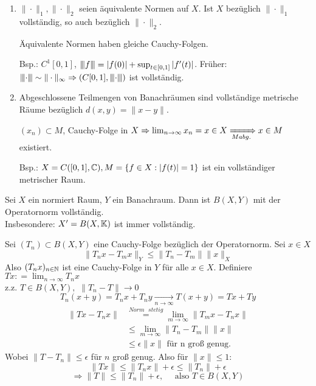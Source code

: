\begin{bemerkung}
	\begin{enumerate}[label=\alph*\upshape)]
		\item $\| \cdot \|_{1}, \| \cdot \|_{2}$ seien äquivalente Normen auf $X$. Ist $X$ bezüglich $\| \cdot \|_{1}$ vollständig, so auch bezüglich $\| \cdot \|_{2}$.
			\begin{beweis}
				Äquivalente Normen haben gleiche Cauchy-Folgen.
			\end{beweis}
			Bsp.: $C^{1}[0, 1]$, ${\left\vert\kern-0.25ex\left\vert\kern-0.25ex\left\vert f\right\vert\kern-0.25ex\right\vert\kern-0.25ex\right\vert} = |f(0)| + \sup_{t \in [0, 1]} | f'(t) |$. Früher: ${\left\vert\kern-0.25ex\left\vert\kern-0.25ex\left\vert\cdot\right\vert\kern-0.25ex\right\vert\kern-0.25ex\right\vert} \sim \| \cdot \|_{\infty} \Rightarrow \left( C[0, 1], {\left\vert\kern-0.25ex\left\vert\kern-0.25ex\left\vert\cdot\right\vert\kern-0.25ex\right\vert\kern-0.25ex\right\vert} \right)$ ist vollständig.
		\item Abgeschlossene Teilmengen von 	Banachräumen sind vollständige metrische Räume bezüglich $d(x, y) = \| x - y\|$.
			\begin{beweis}
				$(x_{n}) \subset M$, Cauchy-Folge in $X \Rightarrow \lim_{n \rightarrow \infty} x_{n} = x \in X \xRightarrow[M abg.]{} x \in M$ existiert.	
			\end{beweis}
			Bsp.: $X = C([0, 1], \mathbb{C}), M = \{ f \in X: |f ( t )| = 1 \}$ ist ein vollständiger metrischer Raum.
	\end{enumerate}
\end{bemerkung}


\begin{satz}
	Sei $X$ ein normiert Raum, $Y$ ein Banachraum.
	Dann ist $B(X, Y)$ mit der Operatornorm vollständig. \\
	Insbesondere: $X' = B(X, \mathbb{K})$ ist immer  vollständig.
\end{satz}

\begin{beweis}
	Sei $(T_{n}) \subset B(X, Y)$ eine Cauchy-Folge bezüglich der Operatornorm. Sei $x \in X$
	\[ \| T_{n} x - T_{m} x \|_{Y} \leq \| T_{n} - T_{m} \| \|x\|_{X} \]
	Also $(T_{n}x)_{n \in \mathbb{N}}$ ist eine Cauchy-Folge in $Y$ für alle $x \in X$. Definiere $T x : = \lim_{n \rightarrow \infty} T_{n} x$ \\
	z.z. $T \in B(X, Y),$ $\| T_{n} - T \| \rightarrow 0$ \\
	\[ T_{n} (x + y)  = T_{n} x + T_{n} y \xrightarrow[n \rightarrow \infty]{} T(x + y) = Tx + Ty \]
	\begin{align*}
		\| Tx - T_{n}x \| & \overset{Norm \text{ } stetig}{=} \lim_{m \rightarrow \infty} \| T_{m} x - T_{n} x \| \\
		 & \leq \lim_{m \rightarrow \infty} \| T_{n} - T_{m} \| \| x \| \\
		 & \leq \epsilon \| x \| \text{ für n gro{\ss} genug.}
	\end{align*}
	Wobei $\| T - T_{n} \| \leq \epsilon$ für $n$ gro{\ss} genug.
	Also für $\| x \| \leq 1$:
	\[ \| T x \| \leq \| T_{n} x \| + \epsilon \leq \| T_{n} \| + \epsilon  \]
	\[ \Rightarrow \| T \| \leq \| T_{n} \| + \epsilon, \quad \text{ also } T \in B(X, Y) \]
\end{beweis}


